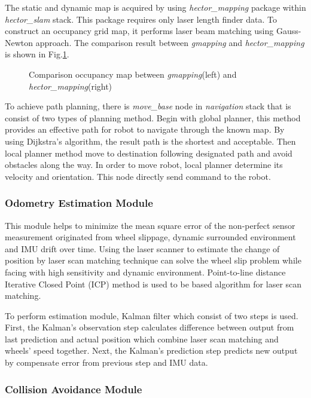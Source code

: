 \documentclass{llncs}
\begin{document}
The static and dynamic map is acquired by using \textit{hector\_mapping} package within \textit{hector\_slam} stack. This package requires only laser length finder data. To construct an occupancy grid map, it performs laser beam matching using Gauss-Newton approach\cite{hector_slam}. The comparison result between \textit{gmapping} and \textit{hector\_mapping} is shown in Fig.\ref{fig:hector}.

\begin{figure}
\centering
\caption{Comparison occupancy map between \textit{gmapping}(left) and \textit{hector\_mapping}(right)}
\label{fig:hector}
\end{figure}

To achieve path planning, there is \textit{move\_base} node in \textit{navigation} stack that is consist of two types of planning method. Begin with global planner, this method provides an effective path for robot to navigate through the known map. By using Dijkstra's algorithm, the result path is the shortest and acceptable. Then local planner method move to destination following designated path and avoid obstacles along the way. In order to move robot, local planner determine its velocity and orientation. This node directly send command to the robot.

\subsubsection{Odometry Estimation Module}

This module helps to minimize the mean square error of the non-perfect sensor measurement originated from wheel slippage, dynamic surrounded environment and IMU drift over time. Using the laser scanner to estimate the change of position by laser scan matching technique can solve the wheel slip problem while facing with high sensitivity and dynamic environment. Point-to-line distance Iterative Closed Point (ICP)\cite{icp1}\cite{icp2} method is used to be based algorithm for laser scan matching.

To perform estimation module, Kalman filter which consist of two steps is used. First, the Kalman's observation step calculates difference between output from last prediction and actual position which combine laser scan matching and wheels' speed together. Next, the Kalman's prediction step predicts new output by compensate error from previous step and IMU data\cite{odom}.

\subsubsection{Collision Avoidance Module}
\end{document}
